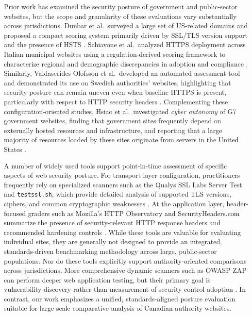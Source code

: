 \documentclass[pdflatex,sn-mathphys-num]{sn-jnl}
\numberwithin{equation}{section}
\theoremstyle{thmstyleone}
\theoremstyle{thmstyletwo}%
\theoremstyle{thmstylethree}%
\begin{document}
\vspace{1em}
Prior work has examined the security posture of government and public-sector websites, but the scope and
granularity of these evaluations vary substantially across jurisdictions. Dunbar et al.\ surveyed a large set
of US-related domains and proposed a compact scoring system primarily driven by SSL/TLS version support and
the presence of HSTS \cite{dunbar4240917survey}. Schiavone et al.\ analyzed HTTPS deployment across Italian
municipal websites using a regulation-derived scoring framework to characterize regional and demographic
discrepancies in adoption and compliance \cite{schiavone2024municipality2https}. Similarly, Valdaserides Olofsson
et al.\ developed an automated assessment tool and demonstrated its use on Swedish authorities’ websites,
highlighting that security posture can remain uneven even when baseline HTTPS is present, particularly with
respect to HTTP security headers \cite{valdaserides2024automated}. Complementing these configuration-oriented
studies, Hsiao et al.\ investigated \emph{cyber autonomy} of G7 government websites, finding that government
sites frequently depend on externally hosted resources and infrastructure, and reporting that a large majority
of resources loaded by these sites originate from servers in the United States \cite{hsiao2019cyberautonomy}.

A number of widely used tools support point-in-time assessment of specific aspects of web security posture.
For transport-layer configuration, practitioners frequently rely on specialized scanners such as the Qualys
SSL Labs Server Test and \texttt{testssl.sh}, which provide detailed analysis of supported TLS versions, ciphers,
and common cryptographic weaknesses \cite{tool_ssllabs_ssltest,tool_testsslsh}. At the application layer,
header-focused graders such as Mozilla's HTTP Observatory and SecurityHeaders.com summarize the presence of
security-relevant HTTP response headers and recommended hardening controls
\cite{tool_mozilla_observatory,tool_securityheaders}. While these tools are valuable for evaluating individual
sites, they are generally not designed to provide an integrated, standards-driven benchmarking methodology
across large, public-sector populations. Nor do these tools explicitly support authority-oriented comparisons
across jurisdictions. More comprehensive dynamic scanners such as OWASP ZAP can perform deeper web application
testing, but their primary goal is vulnerability discovery rather than measurement of security control adoption
\cite{tool_owasp_zap}. In contrast, our work emphasizes a unified, standards-aligned posture evaluation suitable
for large-scale comparative analysis of Canadian authority websites.
\end{document}
